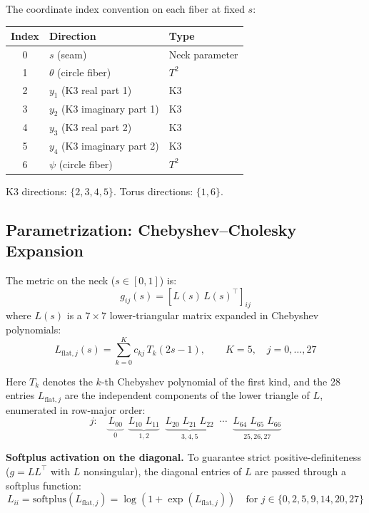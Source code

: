 \documentclass[11pt,a4paper]{article}
\newcommand{\softplus}{\mathrm{softplus}}
\theoremstyle{remark}
\begin{document}
The coordinate index convention on each fiber at fixed $s$:

\begin{table}[H]
\centering
\begin{tabular}{cll}
\toprule
\textbf{Index} & \textbf{Direction} & \textbf{Type} \\
\midrule
0 & $s$ (seam) & Neck parameter \\
1 & $\theta$ (circle fiber) & $T^2$ \\
2 & $y_1$ (K3 real part 1) & K3 \\
3 & $y_2$ (K3 imaginary part 1) & K3 \\
4 & $y_3$ (K3 real part 2) & K3 \\
5 & $y_4$ (K3 imaginary part 2) & K3 \\
6 & $\psi$ (circle fiber) & $T^2$ \\
\bottomrule
\end{tabular}
\end{table}

K3 directions: $\{2, 3, 4, 5\}$. Torus directions: $\{1, 6\}$.

\subsection{Parametrization: Chebyshev--Cholesky Expansion}\label{sec:cheb_chol}

The metric on the neck ($s \in [0, 1]$) is:
\begin{equation}\label{eq:metric_chol}
g_{ij}(s) = [L(s)\, L(s)^\top]_{ij}
\end{equation}
where $L(s)$ is a $7 \times 7$ lower-triangular matrix expanded in Chebyshev polynomials:
\begin{equation}\label{eq:cheb_expansion}
L_{\mathrm{flat},j}(s) = \sum_{k=0}^{K} c_{kj}\, T_k(2s - 1), \qquad K = 5,\quad j = 0, \ldots, 27
\end{equation}

Here $T_k$ denotes the $k$-th Chebyshev polynomial of the first kind, and the 28 entries
$L_{\mathrm{flat},j}$ are the independent components of the lower triangle of $L$, enumerated in
row-major order:
\[
j\!:\quad \underbrace{L_{00}}_{0}\;\; \underbrace{L_{10}\;L_{11}}_{1,2}\;\; \underbrace{L_{20}\;L_{21}\;L_{22}}_{3,4,5}\;\; \cdots\;\; \underbrace{L_{64}\;L_{65}\;L_{66}}_{25,26,27}
\]

\textbf{Softplus activation on the diagonal.} To guarantee strict positive-definiteness
($g = LL^\top$ with $L$ nonsingular), the diagonal entries of $L$ are passed through a softplus
function:
\begin{equation}\label{eq:softplus}
L_{ii} = \softplus(L_{\mathrm{flat},j}) = \log(1 + \exp(L_{\mathrm{flat},j})) \quad \text{for } j \in \{0, 2, 5, 9, 14, 20, 27\}
\end{equation}
\end{document}
